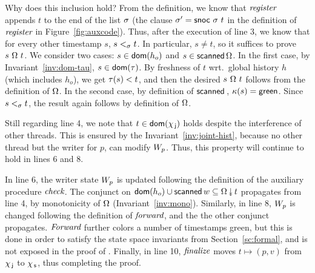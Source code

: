 Why does this inclusion hold? From the definition, we know that
$\textit{register}$ appends $t$ to the end of the list $\sigma$ (the
clause $\ordlistP = \mathsf{snoc}\ {\ordlist}\ t$ in the definition of
$\textit{register}$ in Figure~\ref{fig:auxcode}). Thus, after the
execution of line 3, we know that for every other timestamp $s$, $s
\mathrel{<_\sigma} t$. In particular, $s \neq t$, so it suffices to prove
$s\ {\stableorder}\ t$.
%
We consider two cases: $s \in \mathsf{dom}(h_o)$ and $s \in
\mathsf{scanned}\,\Omega$.  In the first case, by
Invariant~\ref{inv:dom-tau}, $s \in \mathsf{dom}(\tau)$. By freshness of $t$
wrt.~global history $h$ (which includes $h_o$), we get $\tau(s) < t$,
and then the desired $s\ {\stableorder}\ t$ follows from the
definition of $\Omega$.  In the second case, by definition of
$\scanned$, $\kappa(s) = \mathsf{green}$. Since $s \mathrel{<_\sigma} t$, the result
again follows by definition of $\Omega$.

Still regarding line 4, we note that $t \in \mathsf{dom}(\chi_{\, \mathsf{j}})$ holds
despite the interference of other threads. This is ensured by the
Invariant~\ref{inv:joint-hist}, because no other thread but the writer
for $p$, can modify $W_p$. Thus, this property will continue to hold
in lines 6 and 8.

In line 6, the writer state $W_p$ is updated following the definition
of the auxiliary procedure $\textit{check}$. The conjunct on $\dom{h_o}
\cup \scanned{w} \subseteq \sideal{\stableorder}{t}$ propagates from
line 4, by monotonicity of $\Omega$ (Invariant~\ref{inv:mono}).
%
Similarly, in line 8, $W_p$ is changed following the definition of
$\textit{forward}$, and the the other conjunct
propagates. $\textit{Forward}$ further colors a number of timestamps
green, but this is done in order to satisfy the state space invariants
from Section~\ref{sc:formal}, and is not exposed in the proof of
\jywrite.
%
Finally, in line 10, $\textit{finalize}$ moves $t\mapsto(p, v)$ from
$\chi_{\, \mathsf{j}}$ to $\chi_{\, \mathsf{s}}$, thus completing the proof. 





